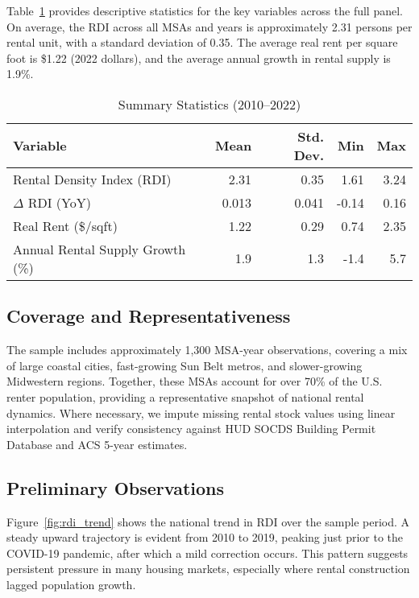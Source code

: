 \documentclass[sn-mathphys-num]{sn-jnl}%
\theoremstyle{thmstyleone}%
\theoremstyle{thmstyletwo}%
\theoremstyle{thmstylethree}%
\begin{document}
Table~\ref{tab:summary_stats} provides descriptive statistics for the key variables across the full panel. On average, the RDI across all MSAs and years is approximately 2.31 persons per rental unit, with a standard deviation of 0.35. The average real rent per square foot is \$1.22 (2022 dollars), and the average annual growth in rental supply is 1.9\%.

\begin{table}[H]
	\centering
	\caption{Summary Statistics (2010--2022)}
	\label{tab:summary_stats}
	\begin{tabular}{lrrrr}
		\toprule
		Variable & Mean & Std. Dev. & Min & Max \\
		\midrule
		Rental Density Index (RDI) & 2.31 & 0.35 & 1.61 & 3.24 \\
		\( \Delta \) RDI (YoY) & 0.013 & 0.041 & -0.14 & 0.16 \\
		Real Rent (\$/sqft) & 1.22 & 0.29 & 0.74 & 2.35 \\
		Annual Rental Supply Growth (\%) & 1.9 & 1.3 & -1.4 & 5.7 \\
		\bottomrule
	\end{tabular}
\end{table}

\subsection{Coverage and Representativeness}

The sample includes approximately 1,300 MSA-year observations, covering a mix of large coastal cities, fast-growing Sun Belt metros, and slower-growing Midwestern regions. Together, these MSAs account for over 70\% of the U.S. renter population, providing a representative snapshot of national rental dynamics. Where necessary, we impute missing rental stock values using linear interpolation and verify consistency against HUD SOCDS Building Permit Database and ACS 5-year estimates.

\subsection{Preliminary Observations}

Figure~\ref{fig:rdi_trend} shows the national trend in RDI over the sample period. A steady upward trajectory is evident from 2010 to 2019, peaking just prior to the COVID-19 pandemic, after which a mild correction occurs. This pattern suggests persistent pressure in many housing markets, especially where rental construction lagged population growth.
\end{document}

